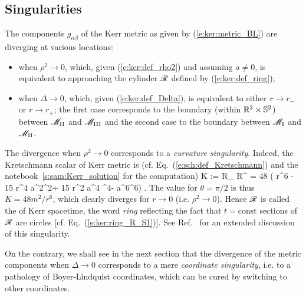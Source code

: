 \subsection{Singularities} \label{s:ker:singularities}

The components $g_{\alpha\beta}$ of the Kerr metric as given by  (\ref{e:ker:metric_BL})
are diverging at various locations:
\begin{itemize}
\item when $\rho^2\rightarrow 0$, which, given (\ref{e:ker:def_rho2})
and assuming $a\not=0$, is equivalent to approaching
the cylinder $\mathscr{R}$ defined by (\ref{e:ker:def_ring});
\item when $\Delta\rightarrow 0$, which, given (\ref{e:ker:def_Delta}), is equivalent to either $r\rightarrow r_-$
or $r\rightarrow r_+$; the first case corresponds to the boundary (within $\mathbb{R}^2\times\mathbb{S}^2$)
between $\mathscr{M}_{\rm II}$ and $\mathscr{M}_{\rm III}$ and the second case to the boundary
between $\mathscr{M}_{\rm I}$ and $\mathscr{M}_{\rm II}$.
\end{itemize}
The divergence when $\rho^2\rightarrow 0$ corresponds to a
\emph{curvature singularity}.
Indeed, the Kretschmann scalar of Kerr metric  is (cf.
Eq.~(\ref{e:sch:def_Kretschmann}) and the notebook~\ref{s:sam:Kerr_solution} for the computation)
\be \label{e:ker:Kretschmann}
    K := R_{\mu\nu\rho\sigma} R^{\mu\nu\rho\sigma}
     = 48  \left( r^6 - 15 r^4 a^2\cos^2\th + 15 r^2 a^4 \cos^4\th - a^6\cos^6\th \right) .
\ee
The value for $\theta=\pi/2$ is thus $K = 48 m^2 / r^6$, which clearly diverges
for $r\rightarrow 0$ (i.e. $\rho^2\rightarrow 0$).
Hence $\mathscr{R}$ is called the
of Kerr spacetime, the word \emph{ring} reflecting the fact that $t=\mathrm{const}$
sections of $\mathscr{R}$ are circles [cf. Eq.~(\ref{e:ker:ring_R_S1})].
See Ref.~\cite{ChrusMY20} for an extended discussion of this singularity.

On the contrary, we shall see in the next section that the divergence
of the metric components when $\Delta\rightarrow 0$ corresponds to
a mere
\emph{coordinate singularity},
i.e. to a pathology of Boyer-Lindquist coordinates, which can be cured by switching to
other coordinates.


